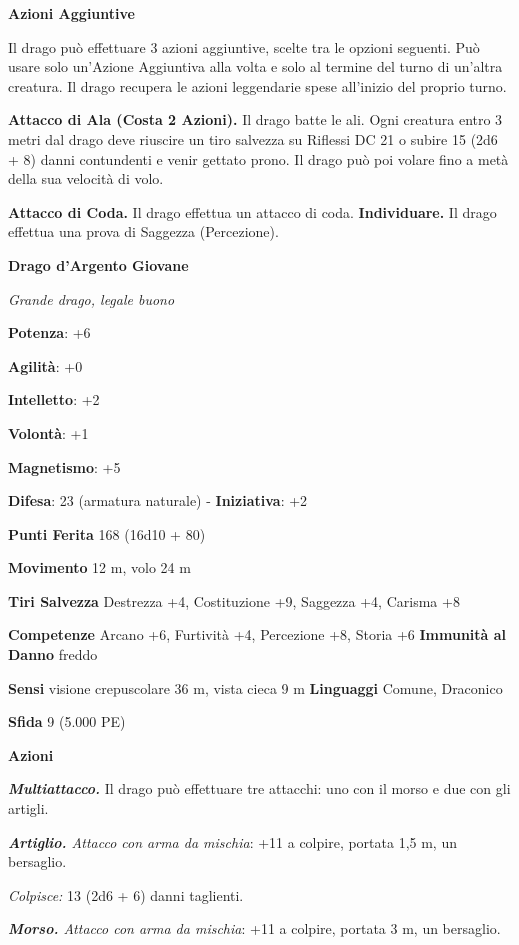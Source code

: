 \begin{multicols}{2}
\textbf{Azioni Aggiuntive}

Il drago può effettuare 3 azioni aggiuntive, scelte tra le opzioni
seguenti. Può usare solo un'Azione Aggiuntiva alla volta e solo al
termine del turno di un'altra creatura. Il drago recupera le azioni
leggendarie spese all'inizio del proprio turno.

\textbf{Attacco di Ala (Costa 2 Azioni).} Il drago batte le ali. Ogni
creatura entro 3 metri dal drago deve riuscire un tiro salvezza su Riflessi DC 21 o subire 15 (2d6 + 8) danni contundenti e venir gettato
prono. Il drago può poi volare fino a metà della sua velocità di volo.

\textbf{Attacco di Coda.} Il drago effettua un attacco di coda.
\textbf{Individuare.} Il drago effettua una prova di Saggezza
(Percezione).

\textbf{Drago d'Argento Giovane}

\emph{Grande drago, legale buono}

\textbf{Potenza}: +6

\textbf{Agilità}: +0

\textbf{Intelletto}: +2

\textbf{Volontà}: +1

\textbf{Magnetismo}: +5

\textbf{Difesa}: 23 (armatura naturale) - \textbf{Iniziativa}: +2

\textbf{Punti Ferita} 168 (16d10 + 80)

\textbf{Movimento} 12 m, volo 24 m

\textbf{Tiri Salvezza} Destrezza +4, Costituzione +9, Saggezza +4,
Carisma +8

\textbf{Competenze} Arcano +6, Furtività +4, Percezione +8, Storia +6
\textbf{Immunità al Danno} freddo

\textbf{Sensi} visione crepuscolare 36 m, vista cieca 9 m
\textbf{Linguaggi} Comune, Draconico

\textbf{Sfida} 9 (5.000 PE)

\textbf{Azioni}

\emph{\textbf{Multiattacco.}} Il drago può effettuare tre attacchi: uno
con il morso e due con gli artigli.

\emph{\textbf{Artiglio.} Attacco con arma da mischia}: +11 a colpire,
portata 1,5 m, un bersaglio.

\emph{Colpisce:} 13 (2d6 + 6) danni taglienti.

\emph{\textbf{Morso.} Attacco con arma da mischia}: +11 a colpire,
portata 3 m, un bersaglio.


\end{multicols}

